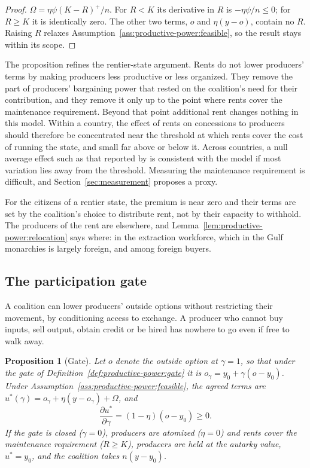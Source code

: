 \documentclass[11pt,letterpaper]{article}
\newtheorem{proposition}[theorem]{Proposition}
\theoremstyle{definition}
\theoremstyle{remark}
\begin{document}
\begin{proof}
$\Omega=\eta\psi(K-R)^+/n$. For $R<K$ its derivative in $R$ is $-\eta\psi/n\le 0$; for $R\ge K$ it is identically zero. The other two terms, $o$ and $\eta(y-o)$, contain no $R$. Raising $R$ relaxes Assumption~\ref{ass:productive-power:feasible}, so the result stays within its scope.
\end{proof}

The proposition refines the rentier-state argument. Rents do not lower producers' terms by making producers less productive or less organized. They remove the part of producers' bargaining power that rested on the coalition's need for their contribution, and they remove it only up to the point where rents cover the maintenance requirement. Beyond that point additional rent changes nothing in this model. Within a country, the effect of rents on concessions to producers should therefore be concentrated near the threshold at which rents cover the cost of running the state, and small far above or below it. Across countries, a null average effect such as that reported by \citet{habermenaldo2011} is consistent with the model if most variation lies away from the threshold. Measuring the maintenance requirement is difficult, and Section~\ref{sec:measurement} proposes a proxy.

For the citizens of a rentier state, the premium is near zero and their terms are set by the coalition's choice to distribute rent, not by their capacity to withhold. The producers of the rent are elsewhere, and Lemma~\ref{lem:productive-power:relocation} says where: in the extraction workforce, which in the Gulf monarchies is largely foreign, and among foreign buyers.

\subsection{The participation gate}

A coalition can lower producers' outside options without restricting their movement, by conditioning access to exchange. A producer who cannot buy inputs, sell output, obtain credit or be hired has nowhere to go even if free to walk away.

\begin{proposition}[Gate]
\label{prop:productive-power:gate}
Let $o$ denote the outside option at $\gamma=1$, so that under the gate of Definition~\ref{def:productive-power:gate} it is $o_\gamma=y_0+\gamma(o-y_0)$. Under Assumption~\ref{ass:productive-power:feasible}, the agreed terms are $u^*(\gamma)=o_\gamma+\eta(y-o_\gamma)+\Omega$, and
\[
\frac{\partial u^*}{\partial\gamma}=(1-\eta)(o-y_0)\ge 0 .
\]
If the gate is closed ($\gamma=0$), producers are atomized ($\eta=0$) and rents cover the maintenance requirement ($R\ge K$), producers are held at the autarky value, $u^*=y_0$, and the coalition takes $n(y-y_0)$.
\end{proposition}
\end{document}
